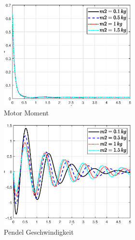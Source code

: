 \begin{figure}
\begin{figure}
\begin{subfigure}[b]{0.49\linewidth}
        \includegraphics[width=\linewidth]{Bilder/5_sensi/fig/m2/tau.eps}
        \caption{Motor Moment}
        \label{fig:m2_tau}
    \end{subfigure}
    \begin{subfigure}[b]{0.49\linewidth}
        \includegraphics[width=\linewidth]{Bilder/5_sensi/fig/m2/theta_punkt.eps}
        \caption{Pendel Geschwindigkeit}
        \label{fig:m2_theta_punkt}      
    \end{subfigure}
    \begin{subfigure}[b]{0.49\linewidth}

\end{subfigure}
\end{figure}
\end{figure}
